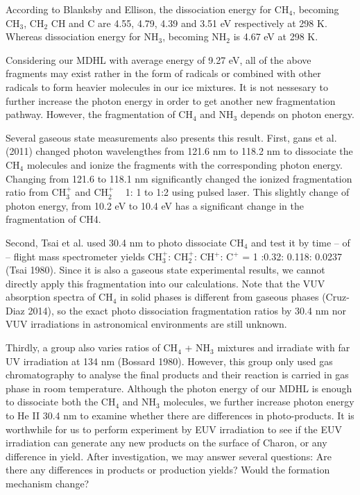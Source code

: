 According to Blanksby and Ellison, the dissociation energy for CH$_4$, becoming CH$_3$, CH$_2$ CH and C are 4.55, 4.79, 4.39 and 3.51 eV respectively at 298 K. Whereas dissociation energy for NH$_3$, becoming NH$_2$ is 4.67 eV at 298 K.

Considering our MDHL with average energy of 9.27 eV, all of the above fragments may exist rather in the form of radicals or combined with other radicals to form heavier molecules in our ice mixtures. It is not nessesary to further increase the photon energy in order to get another new fragmentation pathway. However, the fragmentation of CH$_4$ and NH$_3$ depends on photon energy.

Several gaseous state measurements also presents this result. First, gans et al. (2011) changed photon wavelengthes from 121.6 nm to 118.2 nm to dissociate the CH$_4$ molecules and ionize the fragments with the corresponding photon energy. Changing from 121.6 to 118.1 nm significantly changed the ionized fragmentation ratio from CH$_3^+$ and CH$_2^+$ ~ 1: 1 to 1:2 using pulsed laser. This slightly change of photon energy, from 10.2 eV to 10.4 eV has a significant change in the fragmentation of CH4.

Second, Tsai et al. used 30.4 nm to photo dissociate CH$_4$ and test it by time – of – flight mass spectrometer yields CH$_3^+$: CH$_2^+$: CH$^+$: C$^+$ = 1 :0.32: 0.118: 0.0237 (Tsai 1980). Since it is also a gaseous state experimental results, we cannot directly apply this fragmentation into our calculations. Note that the VUV absorption spectra of CH$_4$ in solid phases is different from gaseous phases (Cruz-Diaz 2014), so the exact photo dissociation fragmentation ratios by 30.4 nm nor VUV irradiations in astronomical environments are still unknown.

Thirdly, a group also varies ratios of CH$_4$ + NH$_3$ mixtures and irradiate with far UV irradiation at 134 nm (Bossard 1980). However, this group only used gas chromatography to analyse the final products and their reaction is carried in gas phase in room temperature. Although the photon energy of our MDHL is enough to dissociate both the CH$_4$ and NH$_3$ molecules, we further increase photon energy to He II 30.4 nm to examine whether there are differences in photo-products. It is worthwhile for us to perform experiment by EUV irradiation to see if the EUV irradiation can generate any new products on the surface of Charon, or any difference in yield. After investigation, we may answer several questions: Are there any differences in products or production yields? Would the formation mechanism change?

